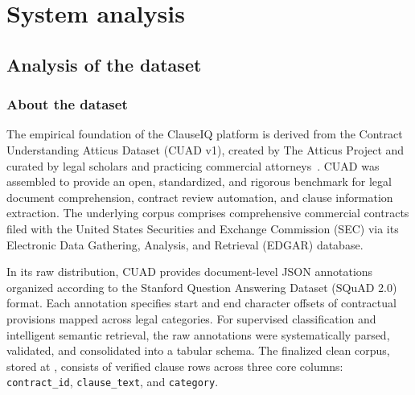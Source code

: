 \chapter{System analysis}
\label{ch:system_analysis}

\section{Analysis of the dataset}
\label{sec:dataset_analysis}

\subsection{About the dataset}
\label{subsec:about_dataset}

The empirical foundation of the ClauseIQ platform is derived from the Contract Understanding Atticus Dataset (CUAD v1), created by The Atticus Project and curated by legal scholars and practicing commercial attorneys~\cite{hendrycks2021cuad}. CUAD was assembled to provide an open, standardized, and rigorous benchmark for legal document comprehension, contract review automation, and clause information extraction. The underlying corpus comprises \TotalContracts{} comprehensive commercial contracts filed with the United States Securities and Exchange Commission (SEC) via its Electronic Data Gathering, Analysis, and Retrieval (EDGAR) database.

In its raw distribution, CUAD provides document-level JSON annotations organized according to the Stanford Question Answering Dataset (SQuAD 2.0) format. Each annotation specifies start and end character offsets of contractual provisions mapped across \NumClasses{} legal categories. For supervised classification and intelligent semantic retrieval, the raw annotations were systematically parsed, validated, and consolidated into a tabular schema. The finalized clean corpus, stored at , consists of \TotalClauses{} verified clause rows across three core columns: \texttt{contract\_id}, \texttt{clause\_text}, and \texttt{category}.

